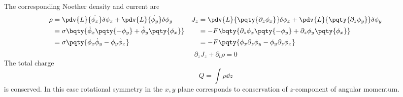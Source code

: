 \documentclass[12pt]{article}
\begin{document}
            The corresponding Noether density and current are \begin{align*}
                \rho &=  \pdv{L}{\dot{\phi_x}} \delta \phi_x +\pdv{L}{\dot{\phi_y}} \delta \phi_y&J_z&= \pdv{L}{\pqty{\partial_z\phi_x }}\delta \phi_x +\pdv{L}{\pqty{\partial_z\phi_y }} \delta \phi_y\\
                &= \sigma \bqty{\dot{\phi}_x \pqty{ -\phi_y} +\dot{\phi}_y \pqty{\phi_x}}&&=- F\bqty{\partial_z\phi_x\pqty{ - \phi_y} + \partial_z \phi_y\pqty{\phi_x}}\\
                &= \sigma \pqty{\phi_x\dot{\phi}_y - \phi_y\dot{\phi}_x}&&=- F\pqty{\phi_x\partial_z\phi_y - \phi_y \partial_z\phi_x}
            \end{align*}
            \[
                \partial_z J_z + \partial_t \rho = 0
            \]
            The total charge 
            \[
                Q =\int \rho \dd{z}
            \]
            is conserved. In this case rotational symmetry in the \(x,y\) plane corresponds to conservation of \(z\)-component of angular momentum.
\end{document}
